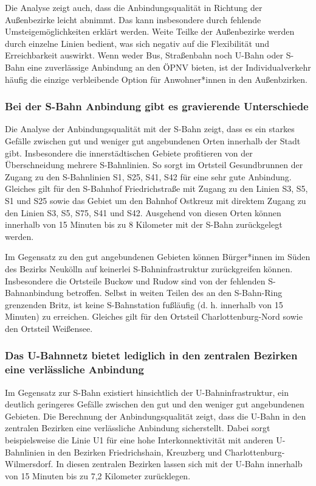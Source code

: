 
Die Analyse zeigt auch, dass die Anbindungsqualität in Richtung der Außenbezirke leicht abnimmt. Das kann insbesondere durch fehlende Umsteigemöglichkeiten erklärt werden. Weite Teilke der Außenbezirke werden durch einzelne Linien bedient, was sich negativ auf die Flexibilität und Erreichbarkeit auswirkt. Wenn weder Bus, Straßenbahn noch U-Bahn oder S-Bahn eine zuverlässige Anbindung an den ÖPNV bieten, ist der Individualverkehr häufig die einzige verbleibende Option für Anwohner*innen in den Außenbzirken.

\subsubsection{Bei der S-Bahn Anbindung gibt es gravierende Unterschiede}
Die Analyse der Anbindungsqualität mit der S-Bahn zeigt, dass es ein starkes Gefälle zwischen gut und weniger gut angebundenen Orten innerhalb der Stadt gibt. Insbesondere die innerstädtischen Gebiete profitieren von der Überschneidung mehrere S-Bahnlinien. So sorgt im Ortsteil Gesundbrunnen der Zugang zu den S-Bahnlinien S1, S25, S41, S42 für eine sehr gute Anbindung. Gleiches gilt für den S-Bahnhof Friedrichstraße mit Zugang zu den Linien S3, S5, S1 und S25 sowie das Gebiet um den Bahnhof Ostkreuz mit direktem Zugang zu den Linien S3, S5, S75, S41 und S42. Ausgehend von diesen Orten können innerhalb von 15 Minuten bis zu 8 Kilometer mit der S-Bahn zurückgelegt werden.


Im Gegensatz zu den gut angebundenen Gebieten können Bürger*innen im Süden des Bezirks Neukölln auf keinerlei S-Bahninfrastruktur zurückgreifen können. Insbesondere die Ortsteile Buckow und Rudow sind von der fehlenden S-Bahnanbindung betroffen. Selbst in weiten Teilen des an den S-Bahn-Ring grenzenden Britz, ist keine S-Bahnstation fußläufig (d. h. innerhalb von 15 Minuten) zu erreichen. Gleiches gilt für den Ortsteil Charlottenburg-Nord sowie den Ortsteil Weißensee.


\subsubsection{Das U-Bahnnetz bietet lediglich in den zentralen Bezirken eine verlässliche Anbindung}
Im Gegensatz zur S-Bahn existiert hinsichtlich der U-Bahninfrastruktur, ein deutlich geringeres Gefälle zwischen den gut und den weniger gut angebundenen Gebieten. Die Berechnung der Anbindungsqualität zeigt, dass die U-Bahn in den zentralen Bezirken eine verlässliche Anbindung sicherstellt. Dabei sorgt beispielsweise die Linie U1 für eine hohe Interkonnektivität mit anderen U-Bahnlinien in den Bezirken Friedrichshain, Kreuzberg und Charlottenburg-Wilmersdorf. In diesen zentralen Bezirken lassen sich mit der U-Bahn innerhalb von 15 Minuten bis zu 7,2 Kilometer zurücklegen.

